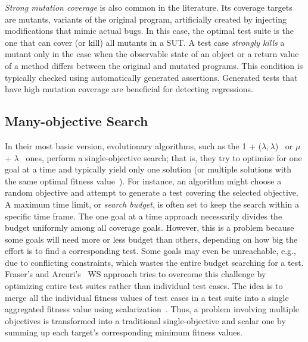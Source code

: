 \documentclass[paper=a4,%
  twoside,%
  BCOR4mm,%
  abstract=true,%
  toc=bibliography,%
  chapterprefix=true,%
  toc=bibliographynumbered,%
  open=right,%
  english,%
  pagesize=pdftex]{scrreprt}
\newcommand{\sut}{\ac{SUT}\xspace}
\begin{document}
\emph{Strong mutation coverage} is also common in the literature. Its coverage targets are mutants, variants of the original program, artificially created by injecting modifications that mimic actual bugs. In this case, the optimal test suite is the one that can cover (or kill) all mutants in a \sut. A test case \emph{strongly kills} a mutant only in the case when the observable state of an object or a return value of a method differs between the original and mutated programs. This condition is typically checked using automatically generated assertions. Generated tests that have high mutation coverage are beneficial for detecting regressions.


\subsection{Many-objective Search}
In their most basic version, evolutionary algorithms, such as the 1 + ($\lambda,\lambda$)~\cite{Doerr2015} or $\mu$ + $\lambda$~\cite{TerSarkisov2011} ones, perform a single-objective search; that is, they try to optimize for one goal at a time and typically yield only one solution (or multiple solutions with the same optimal fitness value~\cite{Panichella2018}). For instance, an algorithm might choose a random objective and attempt to generate a test covering the selected objective. A maximum time limit, or \emph{search budget}, is often set to keep the search within a specific time frame. The one goal at a time approach necessarily divides the budget uniformly among all coverage goals. However, this is a problem because some goals will need more or less budget than others, depending on how big the effort is to find a corresponding test. Some goals may even be unreachable, e.g., due to conflicting constraints, which wastes the entire budget searching for a test. Fraser's and Arcuri's~\cite{Fraser_2013} \ac{WS} approach tries to overcome this challenge by optimizing entire test suites rather than individual test cases. The idea is to merge all the individual fitness values of test cases in a test suite into a single aggregated fitness value using scalarization~\cite{Deb2014}. Thus, a problem involving multiple objectives is transformed into a traditional single-objective and scalar one by summing up each target's corresponding minimum fitness values.
\end{document}
